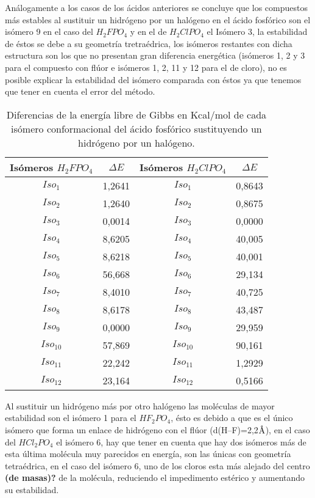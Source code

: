 Análogamente a los casos de los ácidos anteriores se concluye que los compuestos más estables al sustituir un hidrógeno por un halógeno en el ácido fosfórico son el isómero 9 en el caso del $H_2FPO_4$ y en el de $H_2ClPO_4$ el Isómero 3, la estabilidad de éstos se debe a su geometría tretraédrica, los isómeros restantes con dicha estructura son los que no presentan gran diferencia energética (isómeros 1, 2 y 3 para el compuesto con flúor e isómeros 1, 2, 11 y 12 para el de cloro), no es posible explicar la estabilidad del isómero comparada con éstos ya que tenemos que tener en cuenta el error del método. 

\begin{table}[H]
\begin{center}
\begin{tabular}{|c|c|c|c|}
\hline
Isómeros $H_2FPO_4$ & $\Delta E$ & Isómeros $H_2ClPO_4$ & $\Delta E$ \\ \hline
$Iso_1$& 1,2641 & $Iso_1$ & 0,8643 \\ \hline
$Iso_2$ & 1,2640 & $Iso_2$ & 0,8675 \\ \hline
$Iso_3$ & 0,0014 & $Iso_3$ & 0,0000 \\ \hline
$Iso_4$	& 8,6205 & $Iso_4$ & 40,005 \\ \hline
$Iso_5$	& 8,6218 & $Iso_5$ & 40,001 \\ \hline
$Iso_6$	& 56,668 & $Iso_6$ & 29,134 \\ \hline
$Iso_7$	& 8,4010 & $Iso_7$ & 40,725 \\ \hline
$Iso_8$	& 8,6178 & $Iso_8$ & 43,487 \\ \hline
$Iso_9$	& 0,0000 & $Iso_9$ & 29,959 \\ \hline
$Iso_{10}$	& 57,869 & $Iso_{10}$ & 90,161 \\ \hline
$Iso_{11}$ & 22,242 & $Iso_{11}$ & 1,2929 \\ \hline
$Iso_{12}$ & 23,164 & $Iso_{12}$ & 0,5166 \\ \hline
\end{tabular}
\caption{Diferencias de la energía libre de Gibbs en Kcal/mol de cada isómero conformacional del ácido fosfórico sustituyendo un hidrógeno por un halógeno.}
\end{center}
\end{table}

Al sustituir un hidrógeno más por otro halógeno las moléculas de mayor estabilidad son el isómero 1 para el  $HF_2PO_4$, ésto es debido a que es el único isómero que forma un enlace de hidrógeno con el flúor (d(H--F)=2,2$\mbox{\normalfont\AA}$), en el caso del  $HCl_2PO_4$ el isómero 6, hay que tener en cuenta que hay dos isómeros más de esta última molécula muy parecidos en energía, son las únicas con geometría tetraédrica, en el caso del isómero 6, uno de los cloros esta más alejado del centro {\bfseries(de masas)?} de la molécula, reduciendo el impedimento estérico y aumentando su estabilidad.

